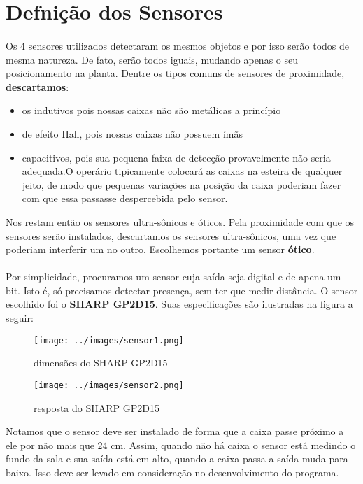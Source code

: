 \section{Defnição dos Sensores}
\paragraph{}Os 4 sensores utilizados detectaram os mesmos objetos e por isso serão todos de mesma natureza. De fato, serão todos iguais, mudando apenas o seu posicionamento na planta. Dentre os tipos comuns de sensores de proximidade, \textbf{descartamos}:
\begin{itemize}
	\item os indutivos pois nossas caixas não são metálicas a princípio
	\item de efeito Hall, pois nossas caixas não possuem ímãs 
	\item capacitivos, pois sua pequena faixa de detecção provavelmente não seria adequada.O operário tipicamente
	colocará as caixas na esteira de qualquer jeito, de modo que pequenas variações na posição da caixa poderiam fazer com que essa passasse 	        despercebida pelo sensor.
\end{itemize} 

Nos restam então os sensores ultra-sônicos e óticos. Pela proximidade com que os sensores serão instalados, descartamos os sensores ultra-sônicos, uma vez que poderiam interferir um no outro. Escolhemos portante um sensor \textbf{ótico}.

\paragraph{} Por simplicidade, procuramos um sensor cuja saída seja digital e de apena um bit. Isto é, só precisamos detectar presença, sem 
ter que medir distância. O sensor escolhido foi o \textbf{SHARP GP2D15}.  Suas especificações são ilustradas na figura a seguir:

\begin{figure}[H]
	\centering
	\texttt{[image: ../images/sensor1.png]}
	\caption{dimensões do SHARP GP2D15}
\end{figure}
\begin{figure}[H]
	\centering
	\texttt{[image: ../images/sensor2.png]}
	\caption{resposta do SHARP GP2D15}
\end{figure}

Notamos que o sensor deve ser instalado de forma que a caixa passe próximo a ele por não mais que 24 cm. Assim, quando não há caixa
o sensor está medindo o fundo da sala e sua saída está em alto, quando a caixa passa a saída muda para baixo. Isso deve ser levado
em consideração no desenvolvimento do programa.

